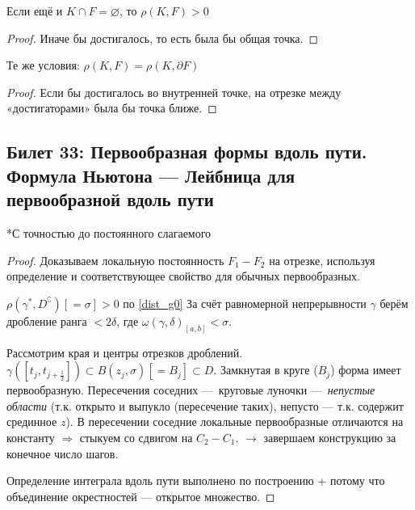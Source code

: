 \documentclass[12pt, a4paper, oneside]{memoir}
\begin{document}
\begin{corollary}\label{dist_g0}
    Если ещё и $K \cap F = \varnothing$, то $\rho(K, F) > 0$

    \begin{proof}
        Иначе бы достигалось, то есть была бы общая точка.
    \end{proof}
\end{corollary}

\begin{corollary}
    Те же условия: $\rho(K, F) = \rho(K, \partial F)$

    \begin{proof}
        Если бы достигалось во внутренней точке, 
        на отрезке между «достигаторами» была бы точка ближе.
    \end{proof}
\end{corollary}


\subsection{Билет 33: Первообразная формы вдоль пути. Формула Ньютона — Лейбница для первообразной вдоль пути}

\begin{theorem}

    *С точностью до постоянного слагаемого

    \begin{proof}
        \uniqueness Доказываем локальную постоянность $F_1 - F_2$ на отрезке,
    используя определение и соответствующее свойство для обычных первообразных.

        \existence $\rho\left(\gamma^*, D^\complement\right) [ = \sigma] > 0$ по \ref{dist_g0}
        За счёт равномерной непрерывности $\gamma$ берём дробление ранга $< 2\delta$,
        где $\omega(\gamma, \delta)_{[a, b]} < \sigma$.

        Рассмотрим края и центры отрезков дроблений. $\gamma([t_j, t_{j + \frac{1}{2}}]) \subset B(z_j, \sigma) [=B_j] \subset D$.
        Замкнутая в круге ($B_j$) форма имеет первообразную. 
        Пересечения соседних — круговые луночки — \textit{непустые области} (т.к. открыто и выпукло (пересечение таких), непусто — т.к. содержит срединное $z$).
        В пересечении соседние локальные первообразные отличаются на константу $\Rightarrow$ стыкуем со сдвигом на $C_2 - C_1$.
        $→$ завершаем конструкцию за конечное число шагов.

        Определение интеграла вдоль пути выполнено по построению + потому что объединение окрестностей — открытое множество.
    \end{proof}
\end{theorem}
\end{document}
